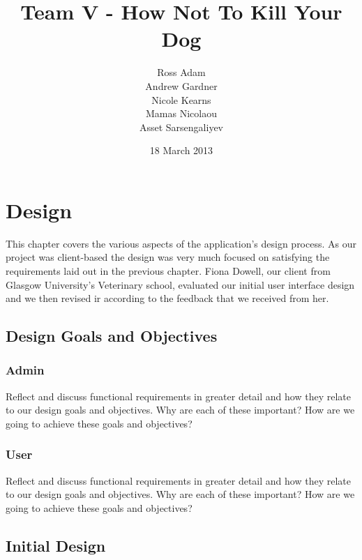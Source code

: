 \documentclass{l3proj}
\begin{document}
\title{Team V - How Not To Kill Your Dog}
\author{Ross Adam \\
        Andrew Gardner \\
        Nicole Kearns \\
        Mamas Nicolaou \\
        Asset Sarsengaliyev}
\date{18 March 2013}
\maketitle

\chapter{Design}
\label{design}

This chapter covers the various aspects of the application's design process. As our project was client-based the design was very much focused on satisfying the requirements laid out in the previous chapter. Fiona Dowell, our client from Glasgow University's Veterinary school, evaluated our initial user interface design and we then revised ir according to the feedback that we received from her. 

\section{Design Goals and Objectives}

	\subsection{Admin}

	Reflect and discuss functional requirements in greater detail and how they relate to our design goals and objectives.
	Why are each of these important?
	How are we going to achieve these goals and objectives?

	\subsection{User}

	Reflect and discuss functional requirements in greater detail and how they relate to our design goals and objectives.
	Why are each of these important?
	How are we going to achieve these goals and objectives?

\section{Initial Design}
\end{document}
